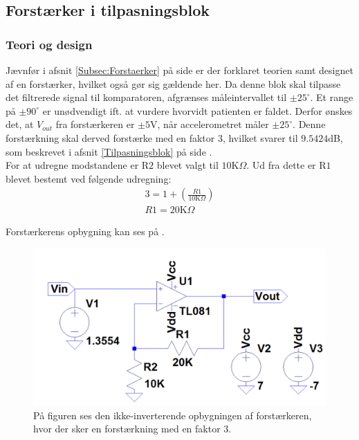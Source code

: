 \subsection{Forstærker i tilpasningsblok}
\subsubsection{Teori og design}
Jævnfør i afsnit \ref{Subsec:Forstaerker} på side \pageref{Subsec:Forstaerker} er der forklaret teorien samt designet af en forstærker, hvilket også gør sig gældende her. Da denne blok skal tilpasse det filtrerede signal til komparatoren, afgrænses måleintervallet til $\pm25^{\circ}$. Et range på $\pm90^{\circ}$ er unødvendigt ift. at vurdere hvorvidt patienten er faldet. Derfor ønskes det, at $V_{out}$ fra forstærkeren er $\pm5$V, når accelerometret måler $\pm25^{\circ}$. Denne forstærkning skal derved forstærke med en faktor 3, hvilket svarer til $9.5424$dB, som beskrevet i afsnit \ref{Tilpasningsblok} på side \pageref{Tilpasningsblok}. \\
For at udregne modstandene er R$2$ blevet valgt til $10$K$\Omega$. Ud fra dette er R$1$ blevet bestemt ved følgende udregning:
\begin{align}
3 = 1 + (\frac{R1}{10\text{K}\Omega})\\
R1 = 20\text{K}\Omega
\end{align}

\noindent Forstærkerens opbygning kan ses på .
\begin{figure}[H]
	\centering
	\includegraphics[scale=0.4]{figures/cProblemloesning/Forstaerker_faktor3.PNG}
	\caption{På figuren ses den ikke-inverterende opbygningen af forstærkeren, hvor der sker en forstærkning med en faktor $3$.}
	\label{fig:Forstaerker_faktor3}
\end{figure}

